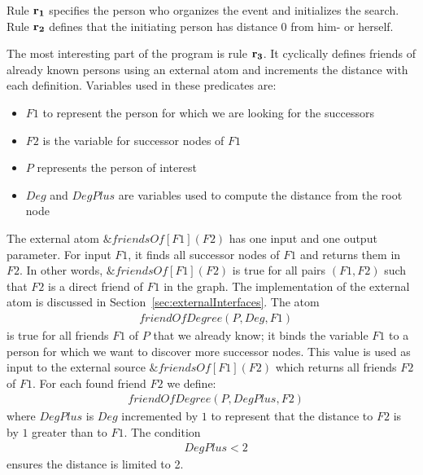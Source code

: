 \documentclass[a4paper, titlepage]{article}
\newcommand{\mi}[1]{\mathit{#1}}
\newcommand{\ext}[3]{\ensuremath{\&{\mathit{#1}}[#2](#3)}}
\newcommand{\row}[1]{%
  \ensuremath{\color{black}\ensuremath{\mathbf{#1}} \color{black}}%
}
\begin{document}
Rule $\row{r_1}$ specifies the person who organizes the event 
and initializes the search.
Rule $\row{r_2}$ defines that the initiating person has 
distance 0 from him- or herself. 

The most interesting part of the program is rule $\row{r_3}$.
It cyclically defines friends of 
already known persons using an external atom
and increments the distance with each 
definition. Variables used in these predicates are: 

\begin{itemize}
\item $\mathit{F1}$ to represent the person for which we are 
looking for the successors

\item $\mathit{F2}$ is the variable for successor 
nodes of $F1$ 

\item $P$ represents the person of interest

\item $\mathit{Deg}$ and $\mi{DegPlus}$ are variables used to 
compute the distance from the root node
\end{itemize}
The external atom \ext{friendsOf}{F1}{F2} has one input and 
one output parameter. For input $\mathit{F1}$, 
it finds all successor nodes of $\mi{F1}$ and returns them in 
$\mathit{F2}$.
%
In other words, \ext{friendsOf}{F1}{F2} is true for all pairs
$(\mi{F1},\mi{F2})$ such that
$\mi{F2}$ is a direct friend of $\mi{F1}$ in the graph.
%
The implementation of the external atom is 
discussed in Section~\ref{sec:externalInterfaces}.
%
The atom
\begin{align*}
& \mathit{friendOfDegree}(P, Deg, F1)
\end{align*}
is true for all friends $\mi{F1}$ of $P$ that we already know;
it binds the variable $\mathit{F1}$ to a person for which we 
want to discover more successor nodes.
%
This value is used as input to 
the external source \ext{friendsOf}{F1}{F2} 
which returns all friends $F2$ of $F1$.
For each found friend $F2$ we define:
\begin{align*}
& \mathit{friendOfDegree}(P, \mi{DegPlus}, F2)
\end{align*} 
where $\mathit{DegPlus}$ is $\mathit{Deg}$ incremented by 
$1$ to represent that the distance to $F2$ is by $1$ 
greater than to $F1$. The condition
\begin{align*}
& \mathit{DegPlus} < 2
\end{align*}
ensures the distance is limited to 2. 
\end{document}

